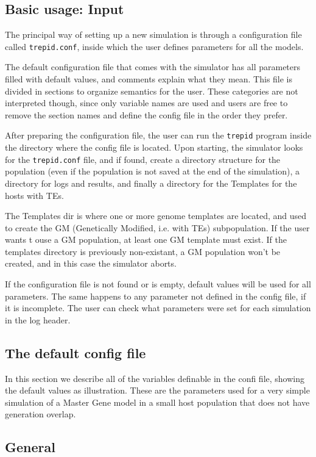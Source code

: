 \documentclass[10pt]{article}
\begin{document}
\subsection{Basic usage: Input}
The principal way of setting up a new simulation is through a
configuration file called \verb|trepid.conf|, inside which the user
defines parameters for all the models.

The default configuration file that comes with the simulator has all
parameters filled with default values, and comments explain what they
mean. This file is divided in sections to organize semantics for the
user. These categories are not interpreted though, since only variable
names are used and users are free to remove the section names and
define the config file in the order they prefer.

After preparing the configuration file, the user can run the
\verb|trepid| program inside the directory where the config file is
located. Upon starting, the simulator looks for the \verb|trepid.conf|
file, and if found, create a directory structure for the population
(even if the population is not saved at the end of the simulation), a
directory for logs and results, and finally a directory for the
Templates for the hosts with TEs.

The Templates dir is where one or more genome templates are located,
and used to create the GM (Genetically Modified, i.e. with TEs)
subpopulation. If the user wants t ouse a GM population, at least one
GM template must exist. If the templates directory is previously
non-existant, a GM population won't be created, and in this case the
simulator aborts.

If the configuration file is not found or is empty, default values
will be used for all parameters. The same happens to any parameter not
defined in the config file, if it is incomplete. The user can check
what parameters were set for each simulation in the log header.

\subsection{The default config file}
\label{sec:default_config}

In this section we describe all of the variables definable in the
confi file, showing the default values as illustration. These are the
parameters used for a very simple simulation of a Master Gene model in
a small host population that does not have generation overlap.

\subsection{General}
\label{sec:default_config_general}
\end{document}
